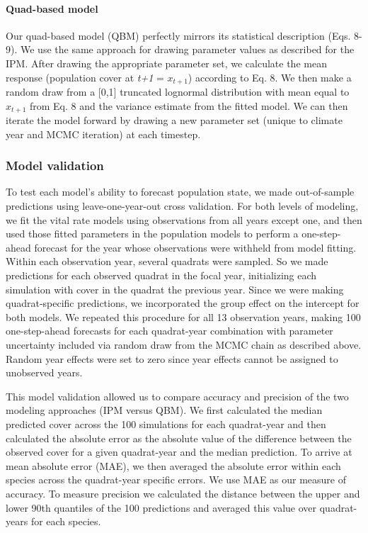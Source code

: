 \documentclass[12pt,]{article}
\begin{document}
\paragraph{Quad-based model}\label{quad-based-model}

Our quad-based model (QBM) perfectly mirrors its statistical description
(Eqs. 8-9). We use the same approach for drawing parameter values as
described for the IPM. After drawing the appropriate parameter set, we
calculate the mean response (population cover at \emph{t+1} = $x_{t+1}$)
according to Eq. 8. We then make a random draw from a {[}0,1{]}
truncated lognormal distribution with mean equal to $x_{t+1}$ from Eq. 8
and the variance estimate from the fitted model. We can then iterate the
model forward by drawing a new parameter set (unique to climate year and
MCMC iteration) at each timestep.

\subsubsection{Model validation}\label{model-validation}

To test each model's ability to forecast population state, we made
out-of-sample predictions using leave-one-year-out cross validation. For
both levels of modeling, we fit the vital rate models using observations
from all years except one, and then used those fitted parameters in the
population models to perform a one-step-ahead forecast for the year
whose observations were withheld from model fitting. Within each
observation year, several quadrats were sampled. So we made predictions
for each observed quadrat in the focal year, initializing each
simulation with cover in the quadrat the previous year. Since we were
making quadrat-specific predictions, we incorporated the group effect on
the intercept for both models. We repeated this procedure for all 13
observation years, making 100 one-step-ahead forecasts for each
quadrat-year combination with parameter uncertainty included via random
draw from the MCMC chain as described above. Random year effects were
set to zero since year effects cannot be assigned to unobserved years.

This model validation allowed us to compare accuracy and precision of
the two modeling approaches (IPM versus QBM). We first calculated the
median predicted cover across the 100 simulations for each quadrat-year
and then calculated the absolute error as the absolute value of the
difference between the observed cover for a given quadrat-year and the
median prediction. To arrive at mean absolute error (MAE), we then
averaged the absolute error within each species across the quadrat-year
specific errors. We use MAE as our measure of accuracy. To measure
precision we calculated the distance between the upper and lower 90th
quantiles of the 100 predictions and averaged this value over
quadrat-years for each species.
\end{document}
